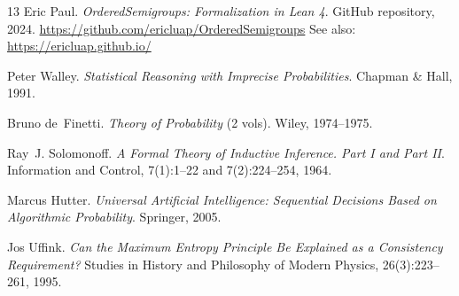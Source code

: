 \documentclass[11pt]{article}
\theoremstyle{definition}
\theoremstyle{remark}
\begin{document}
\begin{thebibliography}{13}
Eric Paul.
\textit{OrderedSemigroups: Formalization in Lean 4}.
GitHub repository, 2024. \url{https://github.com/ericluap/OrderedSemigroups}
See also: \url{https://ericluap.github.io/}

Peter Walley.
\textit{Statistical Reasoning with Imprecise Probabilities}.
Chapman \& Hall, 1991.

Bruno de~Finetti.
\textit{Theory of Probability} (2 vols).
Wiley, 1974--1975.

Ray~J. Solomonoff.
\textit{A Formal Theory of Inductive Inference. Part I and Part II}.
Information and Control, 7(1):1--22 and 7(2):224--254, 1964.

Marcus Hutter.
\textit{Universal Artificial Intelligence: Sequential Decisions Based on Algorithmic Probability}.
Springer, 2005.

Jos Uffink.
\textit{Can the Maximum Entropy Principle Be Explained as a Consistency Requirement?}
Studies in History and Philosophy of Modern Physics, 26(3):223--261, 1995.

\end{thebibliography}
\end{document}
